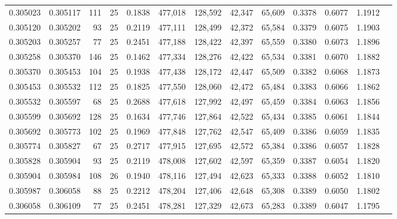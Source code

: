 \begin{tabular}{rrrrrrrrrrrrr}
0.305023 & 0.305117 &   111 &  25 &                                     0.1838 & 477,018 & 128,592 &  42,347 &  65,609 & 0.3378 & 0.6077 & 1.1912 \\
0.305120 & 0.305202 &    93 &  25 &                                     0.2119 & 477,111 & 128,499 &  42,372 &  65,584 & 0.3379 & 0.6075 & 1.1903 \\
0.305203 & 0.305257 &    77 &  25 &                                     0.2451 & 477,188 & 128,422 &  42,397 &  65,559 & 0.3380 & 0.6073 & 1.1896 \\
0.305258 & 0.305370 &   146 &  25 &                                     0.1462 & 477,334 & 128,276 &  42,422 &  65,534 & 0.3381 & 0.6070 & 1.1882 \\
0.305370 & 0.305453 &   104 &  25 &                                     0.1938 & 477,438 & 128,172 &  42,447 &  65,509 & 0.3382 & 0.6068 & 1.1873 \\
0.305453 & 0.305532 &   112 &  25 &                                     0.1825 & 477,550 & 128,060 &  42,472 &  65,484 & 0.3383 & 0.6066 & 1.1862 \\
0.305532 & 0.305597 &    68 &  25 &                                     0.2688 & 477,618 & 127,992 &  42,497 &  65,459 & 0.3384 & 0.6063 & 1.1856 \\
0.305599 & 0.305692 &   128 &  25 &                                     0.1634 & 477,746 & 127,864 &  42,522 &  65,434 & 0.3385 & 0.6061 & 1.1844 \\
0.305692 & 0.305773 &   102 &  25 &                                     0.1969 & 477,848 & 127,762 &  42,547 &  65,409 & 0.3386 & 0.6059 & 1.1835 \\
0.305774 & 0.305827 &    67 &  25 &                                     0.2717 & 477,915 & 127,695 &  42,572 &  65,384 & 0.3386 & 0.6057 & 1.1828 \\
0.305828 & 0.305904 &    93 &  25 &                                     0.2119 & 478,008 & 127,602 &  42,597 &  65,359 & 0.3387 & 0.6054 & 1.1820 \\
0.305904 & 0.305984 &   108 &  26 &                                     0.1940 & 478,116 & 127,494 &  42,623 &  65,333 & 0.3388 & 0.6052 & 1.1810 \\
0.305987 & 0.306058 &    88 &  25 &                                     0.2212 & 478,204 & 127,406 &  42,648 &  65,308 & 0.3389 & 0.6050 & 1.1802 \\
0.306058 & 0.306109 &    77 &  25 &                                     0.2451 & 478,281 & 127,329 &  42,673 &  65,283 & 0.3389 & 0.6047 & 1.1795 \\

\end{tabular}
